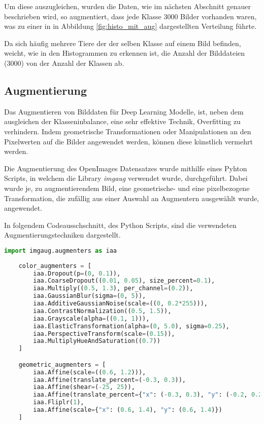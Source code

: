 Um diese auszugleichen, wurden die Daten, wie im nächsten
Abschnitt genauer beschrieben wird, so augmentiert, 
dass jede Klasse 3000 Bilder vorhanden waren, was zu einer in 
in Abbildung \ref{fig:histo_mit_aug} 
dargestellten Verteilung führte.

Da sich häufig mehrere Tiere der der selben Klasse 
auf einem Bild befinden, weicht, wie in den Histogrammen 
zu erkennen ist, die Anzahl der Bilddateien (3000) von 
der Anzahl der Klassen ab.




\subsection{Augmentierung}\label{subsec:augmentation}


Das Augmentieren von Bilddaten für Deep Learning Modelle,
ist, neben dem ausgleichen der Klasseninbalance, eine sehr
effektive Technik, Overfitting zu verhindern.
Indem geometrische Transformationen oder Manipulationen 
an den Pixelwerten auf die Bilder angewendet werden, 
können diese künstlich vermehrt werden.

Die Augmentierung des OpenImages Datensatzes wurde mithilfe 
eines Pyhton Scripts, in welchem die Library 
\textit{imgaug} \cite{imgaug} verwendet wurde, durchgeführt.
Dabei wurde je, zu augmentierendem Bild, eine geometrische- und 
eine pixelbezogene Transformation, die zufällig 
aus einer Auswahl an Augmentern ausgewählt wurde, angewendet.

In folgendem Codeausschschnitt, des Python Scripts, sind die 
verwendeten Augmentierungstechniken dargestellt.


\begin{lstlisting}[language=Python]
    import imgaug.augmenters as iaa
    
    color_augmenters = [
        iaa.Dropout(p=(0, 0.1)),
        iaa.CoarseDropout((0.01, 0.05), size_percent=0.1),
        iaa.Multiply((0.5, 1.3), per_channel=(0.2)),
        iaa.GaussianBlur(sigma=(0, 5)),
        iaa.AdditiveGaussianNoise(scale=((0, 0.2*255))),
        iaa.ContrastNormalization((0.5, 1.5)),
        iaa.Grayscale(alpha=((0.1, 1))),
        iaa.ElasticTransformation(alpha=(0, 5.0), sigma=0.25),
        iaa.PerspectiveTransform(scale=(0.15)),
        iaa.MultiplyHueAndSaturation((0.7))
    ]

    geometric_augmenters = [
        iaa.Affine(scale=((0.6, 1.2))),
        iaa.Affine(translate_percent=(-0.3, 0.3)),
        iaa.Affine(shear=(-25, 25)),
        iaa.Affine(translate_percent={"x": (-0.3, 0.3), "y": (-0.2, 0.2)}),
        iaa.Fliplr(1),
        iaa.Affine(scale={"x": (0.6, 1.4), "y": (0.6, 1.4)})
    ]
    
\end{lstlisting}

